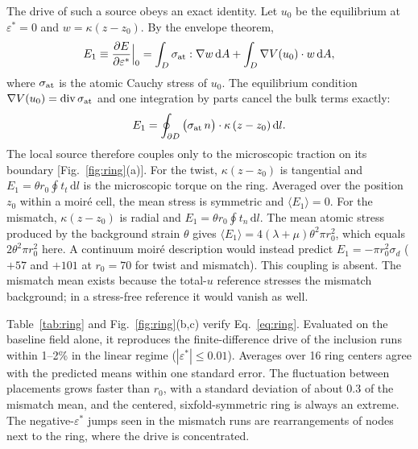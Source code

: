 \documentclass[prb,twocolumn,superscriptaddress,floatfix,10pt]{revtex4-2}
\newcommand{\dd}{\mathrm{d}}
\begin{document}
The drive of such a source obeys an exact identity. Let $u_0$ be the equilibrium at $\varepsilon^*=0$ and $w=\kappa(z-z_0)$. By the envelope theorem,
\begin{equation*}
E_1\equiv\frac{\partial E}{\partial\varepsilon^*}\Big|_0=\int_D\sigma_{\rm at}:\nabla w\,\dd A+\int_D\nabla V(u_0)\cdot w\,\dd A ,
\end{equation*}
where $\sigma_{\rm at}$ is the atomic Cauchy stress of $u_0$. The equilibrium condition $\nabla V(u_0)={\rm div}\,\sigma_{\rm at}$ and one integration by parts cancel the bulk terms exactly:
\begin{equation}
E_1=\oint_{\partial D}\big(\sigma_{\rm at}\,n\big)\cdot\kappa\,(z-z_0)\,\dd l .
\label{eq:ring}
\end{equation}
The local source therefore couples only to the microscopic traction on its boundary [Fig.~\ref{fig:ring}(a)]. For the twist, $\kappa(z-z_0)$ is tangential and $E_1=\theta r_0\oint t_t\,\dd l$ is the microscopic torque on the ring. Averaged over the position $z_0$ within a moir\'e cell, the mean stress is symmetric and $\langle E_1\rangle=0$. For the mismatch, $\kappa(z-z_0)$ is radial and $E_1=\theta r_0\oint t_n\,\dd l$. The mean atomic stress produced by the background strain $\theta$ gives $\langle E_1\rangle=4(\lambda+\mu)\theta^2\pi r_0^2$, which equals $2\theta^2\pi r_0^2$ here. A continuum moir\'e description would instead predict $E_1=-\pi r_0^2\sigma_d$ ($+57$ and $+101$ at $r_0=70$ for twist and mismatch). This coupling is absent. The mismatch mean exists because the total-$u$ reference stresses the mismatch background; in a stress-free reference it would vanish as well.

Table~\ref{tab:ring} and Fig.~\ref{fig:ring}(b,c) verify Eq.~\eqref{eq:ring}. Evaluated on the baseline field alone, it reproduces the finite-difference drive of the inclusion runs within 1--2\% in the linear regime ($|\varepsilon^*|\le0.01$). Averages over 16 ring centers agree with the predicted means within one standard error. The fluctuation between placements grows faster than $r_0$, with a standard deviation of about $0.3$ of the mismatch mean, and the centered, sixfold-symmetric ring is always an extreme. The negative-$\varepsilon^*$ jumps seen in the mismatch runs are rearrangements of nodes next to the ring, where the drive is concentrated.
\end{document}
